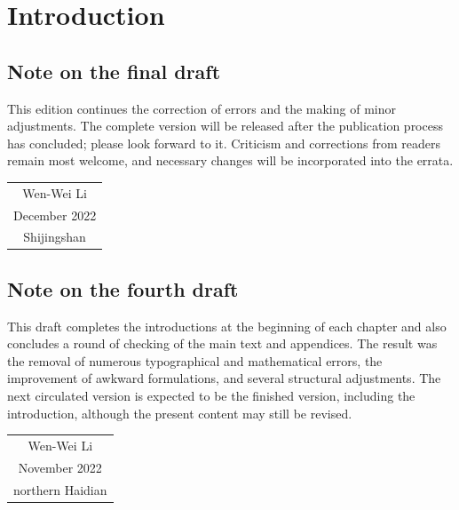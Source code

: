 \chapter*{Introduction}

\section*{Note on the final draft}
This edition continues the correction of errors and the making of minor
adjustments. The complete version will be released after the publication
process has concluded; please look forward to it. Criticism and corrections
from readers remain most welcome, and necessary changes will be incorporated
into the errata.

\vspace{1em}
\begin{flushright}\begin{minipage}{0.3 \textwidth}
  \begin{tabular}{c}
    Wen-Wei Li \\
    December 2022 \\
    Shijingshan
  \end{tabular}
\end{minipage}\end{flushright}
\vspace{1em}

\section*{Note on the fourth draft}
This draft completes the introductions at the beginning of each chapter and
also concludes a round of checking of the main text and appendices. The result
was the removal of numerous typographical and mathematical errors, the
improvement of awkward formulations, and several structural adjustments. The
next circulated version is expected to be the finished version, including the
introduction, although the present content may still be revised.

\vspace{1em}
\begin{flushright}\begin{minipage}{0.3 \textwidth}
  \begin{tabular}{c}
    Wen-Wei Li \\
    November 2022 \\
    northern Haidian
  \end{tabular}
\end{minipage}\end{flushright}
\vspace{1em}

